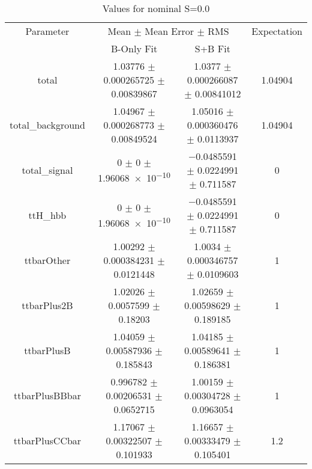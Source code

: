\begin{table}
\centering
\caption{Values for nominal S=0.0}
\begin{tabular}{cccc}
\toprule
Parameter & \multicolumn{2}{c}{Mean $\pm$ Mean Error $\pm$ RMS} & Expectation\\
 & B-Only Fit & S+B Fit & \\
\midrule
total & \num{1.03776} $\pm$ \num{0.000265725} $\pm$ \num{0.00839867} & \num{1.0377} $\pm$ \num{0.000266087} $\pm$ \num{0.00841012} & \num{1.04904}\\
total\_background & \num{1.04967} $\pm$ \num{0.000268773} $\pm$ \num{0.00849524} & \num{1.05016} $\pm$ \num{0.000360476} $\pm$ \num{0.0113937} & \num{1.04904}\\
total\_signal & \num{0} $\pm$ \num{0} $\pm$ \num{1.96068e-10} & \num{-0.0485591} $\pm$ \num{0.0224991} $\pm$ \num{0.711587} & \num{0}\\
ttH\_hbb & \num{0} $\pm$ \num{0} $\pm$ \num{1.96068e-10} & \num{-0.0485591} $\pm$ \num{0.0224991} $\pm$ \num{0.711587} & \num{0}\\
ttbarOther & \num{1.00292} $\pm$ \num{0.000384231} $\pm$ \num{0.0121448} & \num{1.0034} $\pm$ \num{0.000346757} $\pm$ \num{0.0109603} & \num{1}\\
ttbarPlus2B & \num{1.02026} $\pm$ \num{0.0057599} $\pm$ \num{0.18203} & \num{1.02659} $\pm$ \num{0.00598629} $\pm$ \num{0.189185} & \num{1}\\
ttbarPlusB & \num{1.04059} $\pm$ \num{0.00587936} $\pm$ \num{0.185843} & \num{1.04185} $\pm$ \num{0.00589641} $\pm$ \num{0.186381} & \num{1}\\
ttbarPlusBBbar & \num{0.996782} $\pm$ \num{0.00206531} $\pm$ \num{0.0652715} & \num{1.00159} $\pm$ \num{0.00304728} $\pm$ \num{0.0963054} & \num{1}\\
ttbarPlusCCbar & \num{1.17067} $\pm$ \num{0.00322507} $\pm$ \num{0.101933} & \num{1.16657} $\pm$ \num{0.00333479} $\pm$ \num{0.105401} & \num{1.2}\\
\bottomrule
\end{tabular}
\end{table}